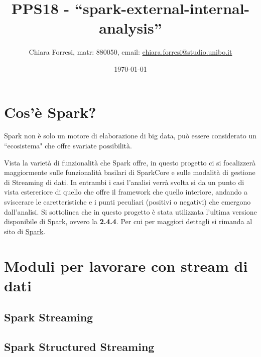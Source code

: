 \documentclass[12pt,italian]{article}
\title{PPS18  - ``spark-external-internal-analysis''}
\author{Chiara Forresi, matr: 880050, email: {\url{chiara.forresi@studio.unibo.it}}}
\date{\today}
\begin{document}
\maketitle
\newpage
\tableofcontents
\newpage

\section{Cos'è Spark?}
Spark non è solo un motore di elaborazione di big data, può essere considerato un ``ecosistema" che offre svariate possibilità.
\par Vista la varietà di funzionalità che Spark offre, in questo progetto ci si focalizzerà maggiormente sulle funzionalità basilari di SparkCore e sulle modalità di gestione di Streaming di dati. In entrambi i casi l'analisi verrà svolta si da un punto di vista estereriore di quello che offre il framework che quello interiore, andando a sviscerare le caretteristiche e i punti peculiari (positivi o negativi) che emergono dall'analisi. 
\newline
Si sottolinea che in questo progetto è stata utilizzata l'ultima versione disponibile di Spark, ovvero la \textbf{2.4.4}. Per cui per maggiori dettagli si rimanda al sito di \href{https://spark.apache.org/docs/2.4.4/quick-start.html}{Spark}.

\section{Moduli per lavorare con stream di dati}
\subsection{Spark Streaming}
\subsection{Spark Structured Streaming}

\end{document}
